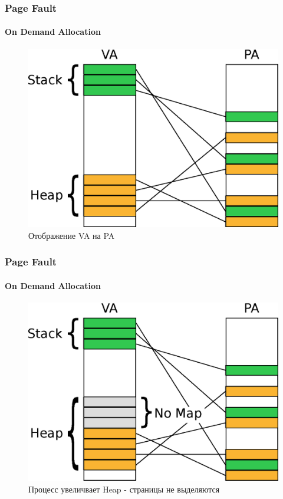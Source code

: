 \begin{frame}
\frametitle{Page Fault}
\framesubtitle{On Demand Allocation}

\begin{figure}
  \centering\includegraphics[width=.8\linewidth]{page-demand0}
  \caption{Отображение VA на PA}
\end{figure}
\end{frame}

\begin{frame}
\frametitle{Page Fault}
\framesubtitle{On Demand Allocation}

\begin{figure}
  \centering\includegraphics[width=.8\linewidth]{page-demand1}
  \caption{Процесс увеличвает Heap - страницы не выделяются}
\end{figure}
\end{frame}

